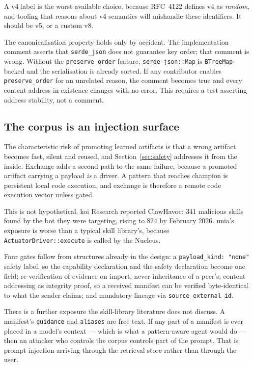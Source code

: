 \documentclass[11pt,twocolumn]{article}
\begin{document}
A v4 label is the worst available choice, because RFC~4122 defines v4 as
\emph{random}, and tooling that reasons about v4 semantics will mishandle these
identifiers. It should be v5, or a custom v8.

The canonicalisation property holds only by accident. The implementation comment
asserts that \texttt{serde\_json} does not guarantee key order; that comment is
wrong. Without the \texttt{preserve\_order} feature, \texttt{serde\_json::Map}
is \texttt{BTreeMap}-backed and the serialisation is already sorted. If any
contributor enables \texttt{preserve\_order} for an unrelated reason, the
comment becomes true and every content address in existence changes with no
error. This requires a test asserting address stability, not a comment.

\subsection{The corpus is an injection surface}

The characteristic risk of promoting learned artifacts is that a wrong artifact
becomes fast, silent and reused, and Section~\ref{sec:safety} addresses it from
the inside. Exchange adds a second path to the same failure, because a promoted
artifact carrying a payload \emph{is} a driver. A pattern that reaches champion
is persistent local code execution, and exchange is therefore a remote code
execution vector unless gated.

This is not hypothetical. koi Research reported ClawHavoc: 341 malicious skills
found by the bot they were targeting, rising to 824 by February 2026. unia's
exposure is worse than a typical skill library's, because
\texttt{ActuatorDriver::execute} is called by the Nucleus.

Four gates follow from structures already in the design: a
\texttt{payload\_kind: "none"} safety label, so the capability declaration and
the safety declaration become one field; re-verification of evidence on import,
never inheritance of a peer's; content addressing as integrity proof, so a
received manifest can be verified byte-identical to what the sender claims; and
mandatory lineage via \texttt{source\_external\_id}.

There is a further exposure the skill-library literature does not discuss. A
manifest's \texttt{guidance} and \texttt{aliases} are free text. If any part of
a manifest is ever placed in a model's context --- which is what a pattern-aware
agent would do --- then an attacker who controls the corpus controls part of the
prompt. That is prompt injection arriving through the retrieval store rather
than through the user.
\end{document}
